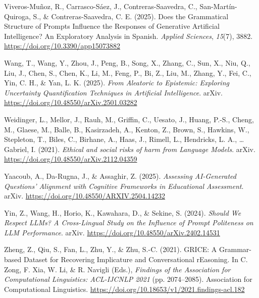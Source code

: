 \documentclass[
  12pt,
]{article}
\newlength{\cslhangindent}
\newenvironment{CSLReferences}[2] %
 {\begin{list}{}{%
  \setlength{\itemindent}{0pt}
  \setlength{\leftmargin}{0pt}
  \setlength{\parsep}{0pt}
  \ifodd #1
   \setlength{\leftmargin}{\cslhangindent}
   \setlength{\itemindent}{-1\cslhangindent}
  \fi
  \setlength{\itemsep}{#2\baselineskip}}}
 {\end{list}}
\begin{document}
\begin{CSLReferences}{1}{0}
Viveros-Muñoz, R., Carrasco-Sáez, J., Contreras-Saavedra, C., San-Martín-Quiroga, S., \& Contreras-Saavedra, C. E. (2025). Does the {Grammatical} {Structure} of {Prompts} {Influence} the {Responses} of {Generative} {Artificial} {Intelligence}? {An} {Exploratory} {Analysis} in {Spanish}. \emph{Applied Sciences}, \emph{15}(7), 3882. \url{https://doi.org/10.3390/app15073882}

Wang, T., Wang, Y., Zhou, J., Peng, B., Song, X., Zhang, C., Sun, X., Niu, Q., Liu, J., Chen, S., Chen, K., Li, M., Feng, P., Bi, Z., Liu, M., Zhang, Y., Fei, C., Yin, C. H., \& Yan, L. K. (2025). \emph{From {Aleatoric} to {Epistemic}: {Exploring} {Uncertainty} {Quantification} {Techniques} in {Artificial} {Intelligence}}. arXiv. \url{https://doi.org/10.48550/arXiv.2501.03282}

Weidinger, L., Mellor, J., Rauh, M., Griffin, C., Uesato, J., Huang, P.-S., Cheng, M., Glaese, M., Balle, B., Kasirzadeh, A., Kenton, Z., Brown, S., Hawkins, W., Stepleton, T., Biles, C., Birhane, A., Haas, J., Rimell, L., Hendricks, L. A., \ldots{} Gabriel, I. (2021). \emph{Ethical and social risks of harm from {Language} {Models}}. arXiv. \url{https://doi.org/10.48550/arXiv.2112.04359}

Yaacoub, A., Da-Rugna, J., \& Assaghir, Z. (2025). \emph{Assessing {AI}-{Generated} {Questions}' {Alignment} with {Cognitive} {Frameworks} in {Educational} {Assessment}}. arXiv. \url{https://doi.org/10.48550/ARXIV.2504.14232}

Yin, Z., Wang, H., Horio, K., Kawahara, D., \& Sekine, S. (2024). \emph{Should {We} {Respect} {LLMs}? {A} {Cross}-{Lingual} {Study} on the {Influence} of {Prompt} {Politeness} on {LLM} {Performance}}. arXiv. \url{https://doi.org/10.48550/arXiv.2402.14531}

Zheng, Z., Qiu, S., Fan, L., Zhu, Y., \& Zhu, S.-C. (2021). {GRICE}: {A} {Grammar}-based {Dataset} for {Recovering} {Implicature} and {Conversational} {rEasoning}. In C. Zong, F. Xia, W. Li, \& R. Navigli (Eds.), \emph{Findings of the {Association} for {Computational} {Linguistics}: {ACL}-{IJCNLP} 2021} (pp. 2074--2085). Association for Computational Linguistics. \url{https://doi.org/10.18653/v1/2021.findings-acl.182}

\end{CSLReferences}
\end{document}
